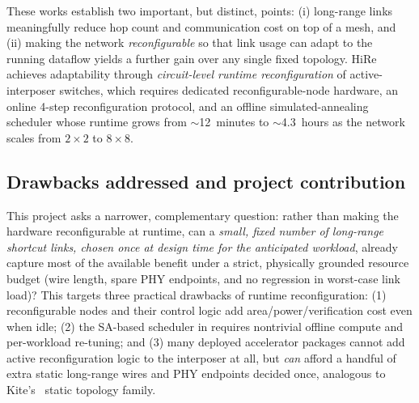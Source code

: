 \documentclass[conference]{IEEEtran}
\begin{document}
These works establish two important, but distinct, points: (i) long-range links meaningfully reduce hop count and communication cost on top of a mesh, and (ii) making the network \emph{reconfigurable} so that link usage can adapt to the running dataflow yields a further gain over any single fixed topology. HiRe achieves adaptability through \emph{circuit-level runtime reconfiguration} of active-interposer switches, which requires dedicated reconfigurable-node hardware, an online 4-step reconfiguration protocol, and an offline simulated-annealing scheduler whose runtime grows from $\sim$12~minutes to $\sim$4.3~hours as the network scales from $2\times2$ to $8\times8$.

\subsection{Drawbacks addressed and project contribution}
This project asks a narrower, complementary question: rather than making the hardware reconfigurable at runtime, can a \emph{small, fixed number of long-range shortcut links, chosen once at design time for the anticipated workload}, already capture most of the available benefit under a strict, physically grounded resource budget (wire length, spare PHY endpoints, and no regression in worst-case link load)? This targets three practical drawbacks of runtime reconfiguration: (1) reconfigurable nodes and their control logic add area/power/verification cost even when idle; (2) the SA-based scheduler in \cite{hire} requires nontrivial offline compute and per-workload re-tuning; and (3) many deployed accelerator packages cannot add active reconfiguration logic to the interposer at all, but \emph{can} afford a handful of extra static long-range wires and PHY endpoints decided once, analogous to Kite's~\cite{kite} static topology family.
\end{document}
